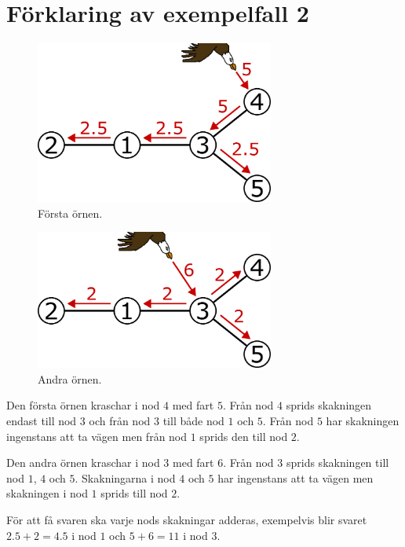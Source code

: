 \section*{Förklaring av exempelfall 2}
\begin{figure}[h]
  \centering
      \includegraphics[width=0.7\textwidth]{a}
      \caption{Första örnen.}
\end{figure}
\begin{figure}[h]
  \centering
      \includegraphics[width=0.7\textwidth]{b}
      \caption{Andra örnen.}
\end{figure}
Den första örnen kraschar i nod $4$ med fart $5$.
Från nod $4$ sprids skakningen endast till nod $3$ och från nod $3$ till både nod $1$ och $5$.
Från nod $5$ har skakningen ingenstans att ta vägen men från nod $1$ sprids den till nod $2$.

Den andra örnen kraschar i nod $3$ med fart $6$.
Från nod $3$ sprids skakningen till nod $1$, $4$ och $5$.
Skakningarna i nod $4$ och $5$ har ingenstans att ta vägen men skakningen i nod $1$ sprids till nod $2$.

För att få svaren ska varje nods skakningar adderas, exempelvis blir svaret $2.5+2=4.5$ i nod $1$ och $5+6=11$ i nod $3$.
